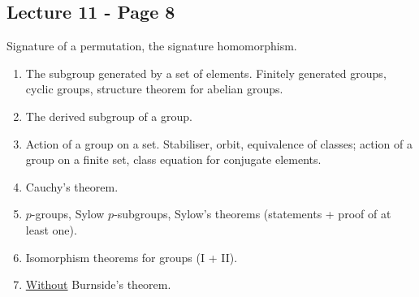 
\subsection*{Lecture 11 - Page 8}

\noindent\hspace*{2em} Signature of a permutation, the signature homomorphism.

\begin{enumerate}
\item[(12)] The subgroup generated by a set of elements. Finitely generated
groups, cyclic groups, structure theorem for abelian groups.
\item[(13)] The derived subgroup of a group.
\item[(14)] Action of a group on a set. Stabiliser, orbit, equivalence of
classes; action of a group on a finite set, class equation for conjugate elements.
\item[(15)] Cauchy's theorem.
\item[(16)] $p$-groups, Sylow $p$-subgroups, Sylow's theorems
(statements + proof of at least one).
\item[(17)] Isomorphism theorems for groups (I + II).
\item[(18)] \underline{Without} Burnside's theorem.
\end{enumerate}
